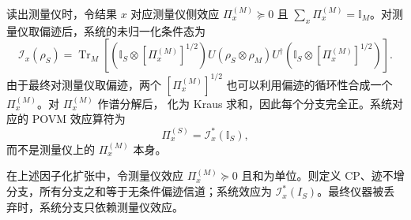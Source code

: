 读出测量仪时，令结果 $x$ 对应测量仪侧效应 $\Pi_x^{(M)}\succeq0$ 且 $\sum_x\Pi_x^{(M)}=\mathbb I_M$。对测量仪取偏迹后，系统的未归一化条件态为
\begin{equation}
\boxed{
\mathcal I_x(\rho_S)
=\operatorname{Tr}_M\!\left[
(\mathbb I_S\otimes [\Pi_x^{(M)}]^{1/2})
U(\rho_S\otimes\rho_M)U^\dagger
(\mathbb I_S\otimes [\Pi_x^{(M)}]^{1/2})
\right].}
\label{eq:general_indirect_measurement_instrument}
\end{equation}
由于最终对测量仪取偏迹，两个 $[\Pi_x^{(M)}]^{1/2}$ 也可以利用偏迹的循环性合成一个 $\Pi_x^{(M)}$。对 $\Pi_x^{(M)}$ 作谱分解后， 化为 Kraus 求和，因此每个分支完全正。系统对应的 POVM 效应算符为
\[
\Pi_x^{(S)}=\mathcal I_x^*(\mathbb I_S),
\]
而不是测量仪上的 $\Pi_x^{(M)}$ 本身。

\begin{proposition}[测量仪效应诱导的条件 CP 分支]
在上述因子化扩张中，令测量仪效应 $\Pi_x^{(M)}\succeq0$ 且和为单位。则定义 CP、迹不增分支，所有分支之和等于无条件偏迹信道；系统效应为 $\mathcal I_x^*(I_S)$。最终仪器被丢弃时，系统分支只依赖测量仪效应。
\end{proposition}
